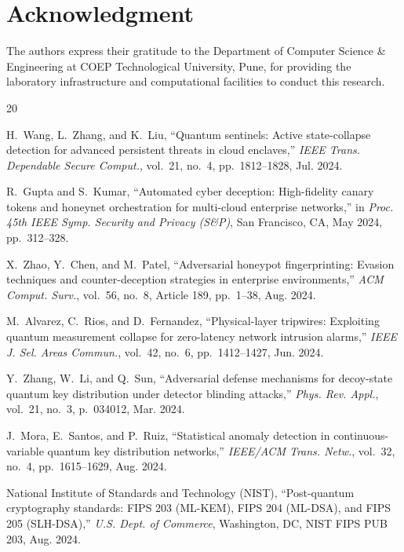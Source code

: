 \documentclass[journal,10pt]{IEEEtran}
\begin{document}
\section*{Acknowledgment}
The authors express their gratitude to the Department of Computer Science \& Engineering at COEP Technological University, Pune, for providing the laboratory infrastructure and computational facilities to conduct this research.

\begin{thebibliography}{20}

H.~Wang, L.~Zhang, and K.~Liu, ``Quantum sentinels: Active state-collapse detection for advanced persistent threats in cloud enclaves,'' \emph{IEEE Trans. Dependable Secure Comput.}, vol.~21, no.~4, pp.~1812--1828, Jul. 2024.

R.~Gupta and S.~Kumar, ``Automated cyber deception: High-fidelity canary tokens and honeynet orchestration for multi-cloud enterprise networks,'' in \emph{Proc. 45th IEEE Symp. Security and Privacy (S\&P)}, San Francisco, CA, May 2024, pp.~312--328.

X.~Zhao, Y.~Chen, and M.~Patel, ``Adversarial honeypot fingerprinting: Evasion techniques and counter-deception strategies in enterprise environments,'' \emph{ACM Comput. Surv.}, vol.~56, no.~8, Article 189, pp.~1--38, Aug. 2024.

M.~Alvarez, C.~Rios, and D.~Fernandez, ``Physical-layer tripwires: Exploiting quantum measurement collapse for zero-latency network intrusion alarms,'' \emph{IEEE J. Sel. Areas Commun.}, vol.~42, no.~6, pp.~1412--1427, Jun. 2024.

Y.~Zhang, W.~Li, and Q.~Sun, ``Adversarial defense mechanisms for decoy-state quantum key distribution under detector blinding attacks,'' \emph{Phys. Rev. Appl.}, vol.~21, no.~3, p.~034012, Mar. 2024.

J.~Mora, E.~Santos, and P.~Ruiz, ``Statistical anomaly detection in continuous-variable quantum key distribution networks,'' \emph{IEEE/ACM Trans. Netw.}, vol.~32, no.~4, pp.~1615--1629, Aug. 2024.

National Institute of Standards and Technology (NIST), ``Post-quantum cryptography standards: FIPS 203 (ML-KEM), FIPS 204 (ML-DSA), and FIPS 205 (SLH-DSA),'' \emph{U.S. Dept. of Commerce}, Washington, DC, NIST FIPS PUB 203, Aug. 2024.


\end{thebibliography}
\end{document}
